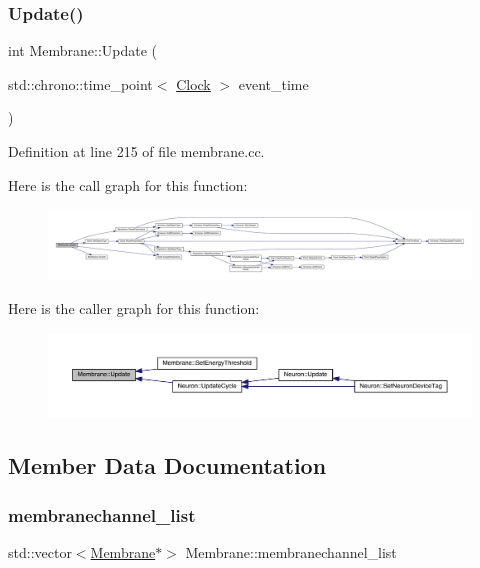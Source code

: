 \subsubsection{\texorpdfstring{Update()}{Update()}}
{\footnotesize\ttfamily int Membrane\+::\+Update (\begin{DoxyParamCaption}\item[{std\+::chrono\+::time\+\_\+point$<$ \hyperlink{universe_8h_a0ef8d951d1ca5ab3cfaf7ab4c7a6fd80}{Clock} $>$}]{event\+\_\+time }\end{DoxyParamCaption})}



Definition at line 215 of file membrane.\+cc.

Here is the call graph for this function\+:
\nopagebreak
\begin{figure}[H]
\begin{center}
\leavevmode
\includegraphics[width=350pt]{class_membrane_a4af9710ea7f0bc6f1b6b6b6462612d51_cgraph}
\end{center}
\end{figure}
Here is the caller graph for this function\+:
\nopagebreak
\begin{figure}[H]
\begin{center}
\leavevmode
\includegraphics[width=350pt]{class_membrane_a4af9710ea7f0bc6f1b6b6b6462612d51_icgraph}
\end{center}
\end{figure}


\subsection{Member Data Documentation}
\mbox{\label{class_membrane_ad41c9c20d5a1bc279f32f9001dee8c50}} 
\subsubsection{\texorpdfstring{membranechannel\+\_\+list}{membranechannel\_list}}
{\footnotesize\ttfamily std\+::vector$<$\hyperlink{class_membrane}{Membrane}$\ast$$>$ Membrane\+::membranechannel\+\_\+list\hspace{0.3cm}{\ttfamily [protected]}}




